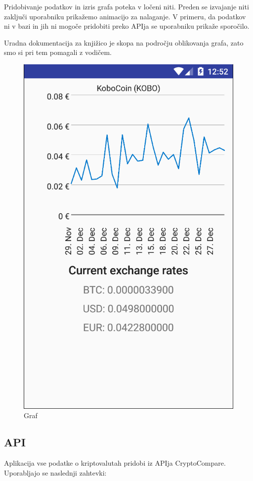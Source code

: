 \documentclass[11pt,a4paper]{article}
\begin{document}
Pridobivanje podatkov in izris grafa poteka v ločeni niti. Preden se
izvajanje niti zaključi uporabniku prikažemo animacijo za nalaganje.
V primeru, da podatkov ni v bazi in jih ni mogoče pridobiti preko
APIja se uporabniku prikaže sporočilo.

Uradna dokumentacija za knjižico je skopa na področju 
oblikovanja grafa, zato smo si pri tem pomagali z vodičem\cite{gtut}.

\begin{figure}[htb]
	\begin{center}
		\includegraphics[width=0.8\columnwidth]{graph.png}
	\end{center}
	\caption{Graf}
	\label{fig:graph}
\end{figure}

\subsection{API}
Aplikacija vse podatke o kriptovalutah pridobi iz APIja CryptoCompare\cite{ccapi}.
Uporabljajo se naslednji zahtevki:
\end{document}
